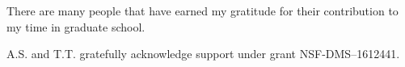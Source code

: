 
There are many people that have earned my gratitude for their contribution to my
time in graduate school.

 \begin{Acknowledgment}
 A.S. and T.T. gratefully acknowledge support under grant NSF-DMS--1612441.
 \end{Acknowledgment}

